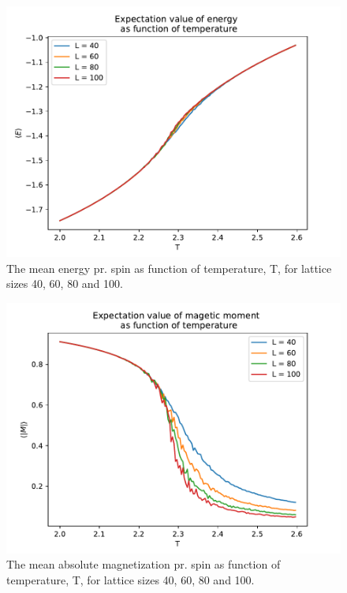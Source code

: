 \documentclass[12pt,english,a4paper]{article}
\newcommand*{\figuretitle}[1]{%
    {\centering%
    \textbf{#1}%
    \par}%
}
\begin{document}
\begin{figure}[H]
    \centering
    \includegraphics[scale=0.7]{Figures/E_of_T_mpi_2_2,6.pdf}
    \caption{The mean energy pr. spin as function of temperature, T, for lattice sizes 40, 60, 80 and 100.}
    \label{fig:E_of_T}
\end{figure}
\begin{figure}[H]
    \centering
    \includegraphics[scale=0.7]{Figures/M_of_T_mpi_2_2,6.pdf}
    \caption{The mean absolute magnetization pr. spin as function of temperature, T, for lattice sizes 40, 60, 80 and 100.}
    \label{fig:M_of_T}
\end{figure}
\end{document}
